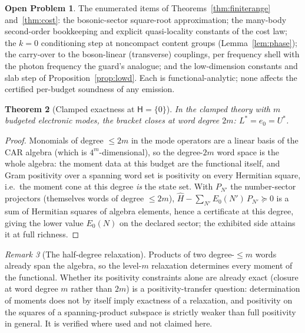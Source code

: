 \documentclass[11pt]{article}
\newtheorem{theorem}{Theorem}[section]
\theoremstyle{definition}
\newtheorem{openproblem}[theorem]{Open Problem}
\theoremstyle{remark}
\newtheorem{remark}[theorem]{Remark}
\begin{document}
\begin{openproblem}\label{op:qedconv}
The enumerated items of Theorems~\ref{thm:finiterange} and~\ref{thm:cost}:
the bosonic-sector square-root approximation; the many-body second-order
bookkeeping and explicit quasi-locality constants of the cost law; the
$k=0$ conditioning step at noncompact content groups
(Lemma~\ref{lem:phase}); the carry-over to the boson-linear (transverse)
couplings, per frequency shell with the photon frequency the guard's
analogue; and the low-dimension constants and slab step of
Proposition~\ref{prop:lowd}.  Each is functional-analytic; none affects the
certified per-budget soundness of any emission.
\end{openproblem}

\begin{theorem}[Clamped exactness at $\mathsf H = \{0\}$]
\label{thm:clamped}
In the clamped theory with $m$ budgeted electronic modes, the bracket
closes at word degree $2m$: $L^* = e_0 = U^*$.
\end{theorem}
\begin{proof}
Monomials of degree $\le 2m$ in the mode operators are a linear basis
of the CAR algebra (which is $4^m$-dimensional), so the degree-$2m$
word space is the whole algebra: the moment data at this budget are
the functional itself, and Gram positivity over a spanning word set is
positivity on every Hermitian square, i.e.\ the moment cone at this
degree \emph{is} the state set.  With $P_{N'}$ the number-sector
projectors (themselves words of degree $\le 2m$), $\hat H -
\sum_{N'} E_0(N')\,P_{N'} \succeq 0$ is a sum of Hermitian squares of
algebra elements, hence a certificate at this degree, giving the lower
value $E_0(N)$ on the declared sector; the exhibited side attains it
at full richness.
\end{proof}

\begin{remark}[The half-degree relaxation]\label{rem:clampeddegree}
Products of two degree-$\le m$ words already span the algebra, so the
level-$m$ relaxation determines every moment of the functional.
Whether its positivity constraints alone are already exact (closure at
word degree $m$ rather than $2m$) is a positivity-transfer question:
determination of moments does not by itself imply exactness of a
relaxation, and positivity on the squares of a spanning-product
subspace is strictly weaker than full positivity in general.  It is
verified where used and not claimed here.
\end{remark}
\end{document}
